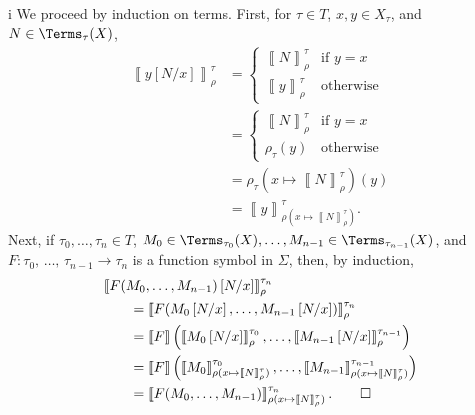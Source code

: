 \begin{partsolution}{i}
We proceed by induction on terms.
First, for \(\tau\in T\), \(x, y \in X_\tau\), and \(N \in \Terms_\tau(X)\),
\begin{align*}
\left\llbracket y\left[N/x\right]\right\rrbracket_\rho^\tau
&=\begin{cases}
\left\llbracket N\right\rrbracket_\rho^\tau & \text{if \(y = x\)} \\
\left\llbracket y\right\rrbracket_\rho^\tau & \text{otherwise}
\end{cases} \\
&=\begin{cases}
\left\llbracket N\right\rrbracket_\rho^\tau & \text{if \(y = x\)} \\
\rho_\tau(y) & \text{otherwise}
\end{cases} \\
&= \rho_\tau(x \mapsto \left\llbracket N\right\rrbracket_\rho^\tau)(y) \\
&=\left\llbracket y\right\rrbracket_{\rho(x \mapsto \left\llbracket N\right\rrbracket_\rho^\tau)}^\tau.
\end{align*}
Next, if \(\tau_0,\ldots,\tau_n\in T\), \(M_0 \in \Terms_{\tau_0}(X), \ldots, M_{n-1} \in \Terms_{\tau_{n-1}}(X)\), and \(F : \tau_0,\,\ldots,\,\tau_{n-1} \to \tau_n\) is a function symbol in \(\Sigma\), then, by induction,
\begin{align*}
&\left\llbracket F(M_0,\ldots,M_{n-1})\left[N/x\right]\right\rrbracket_\rho^{\tau_n} \\
&\qquad=\left\llbracket F(M_0\left[N/x\right],\ldots,M_{n-1}\left[N/x\right])\right\rrbracket_\rho^{\tau_n} \\
&\qquad=\left\llbracket F\right\rrbracket\left(\left\llbracket M_0\left[N/x\right]\right\rrbracket_\rho^{\tau_0},\ldots,\left\llbracket M_{n-1}\left[N/x\right]\right\rrbracket_\rho^{\tau_{n-1}}\right) \\
&\qquad=\left\llbracket F\right\rrbracket\left(\left\llbracket M_0\right\rrbracket_{\rho(x \mapsto \left\llbracket N\right\rrbracket_\rho^\tau)}^{\tau_0},\ldots,\left\llbracket M_{n-1}\right\rrbracket_{\rho(x \mapsto \left\llbracket N\right\rrbracket_\rho^\tau)}^{\tau_{n-1}}\right) \\
&\qquad=\left\llbracket F(M_0,\ldots,M_{n-1})\right\rrbracket_{\rho(x \mapsto \left\llbracket N\right\rrbracket_\rho^\tau)}^{\tau_n}.
\qedhere
\end{align*}
\end{partsolution}

